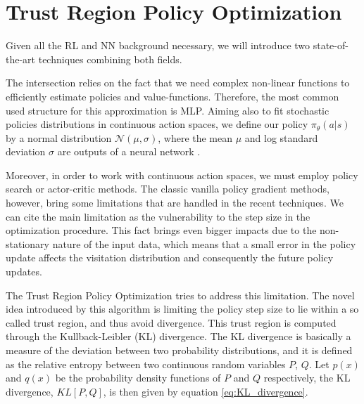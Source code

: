 \section{Trust Region Policy Optimization}

Given all the RL and NN background necessary, we will introduce two state-of-the-art techniques combining both fields.

The intersection relies on the fact that we need complex non-linear functions to efficiently estimate policies and value-functions. Therefore, the most common used structure for this approximation is MLP. Aiming also to fit stochastic policies distributions in continuous action spaces, we define our policy $\pi_{\theta}(a|s)$ by a normal distribution $\mathcal{N}(\mu,\sigma)$, where the mean $\mu$ and log standard deviation $\sigma$ are outputs of a neural network \cite{TRPO}.

Moreover, in order to work with continuous action spaces, we must employ policy search or actor-critic methods. The classic vanilla policy gradient methods, however, bring some limitations that are handled in the recent techniques. We can cite the main limitation as the vulnerability to the step size in the optimization procedure. This fact brings even bigger impacts due to the non-stationary nature of the input data, which means that a small error in the policy update affects the visitation distribution and consequently the future policy updates.


The Trust Region Policy Optimization tries to address this limitation. The novel idea introduced by this algorithm is limiting the policy step size to lie within a so called trust region, and thus avoid divergence. This trust region is computed through the Kullback-Leibler (KL) divergence. The KL divergence is basically a measure of the deviation between two probability distributions, and it is defined as the relative entropy between two continuous random variables $P$, $Q$. Let $p(x)$ and $q(x)$ be the probability density functions of $P$ and $Q$ respectively, the KL divergence, $KL[P,Q]$, is then given by equation \ref{eq:KL_divergence}.

